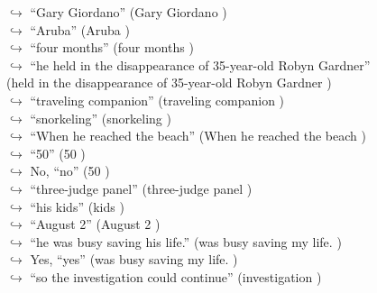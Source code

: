 \documentclass[11pt,a4paper, onecolumn]{article}
\begin{document}
\begin{figure}[t] \small \begin{tcolorbox}[boxsep=0pt,left=5pt,right=0pt,top=2pt,colback = yellow!5] \begin{dialogue}
 \small 
\colorbox{pink!25}{$\hookrightarrow$}
{ ``Gary Giordano'' (Gary Giordano ) }
\\
\colorbox{pink!25}{$\hookrightarrow$}
{ ``Aruba'' (Aruba ) }
\\
\colorbox{pink!25}{$\hookrightarrow$}
{ ``four months'' (four months ) }
\\
\colorbox{pink!25}{$\hookrightarrow$}
{ ``he held in the disappearance of 35-year-old Robyn Gardner'' (held in the disappearance of 35-year-old Robyn Gardner ) }
\\
\colorbox{pink!25}{$\hookrightarrow$}
{ ``traveling companion'' (traveling companion ) }
\\
\colorbox{pink!25}{$\hookrightarrow$}
{ ``snorkeling'' (snorkeling ) }
\\
\colorbox{pink!25}{$\hookrightarrow$}
{ ``When he reached the beach'' (When he reached the beach ) }
\\
\colorbox{pink!25}{$\hookrightarrow$}
{ ``50'' (50 ) }
\\
\colorbox{pink!25}{$\hookrightarrow$}
\colorbox{red!25}{No,}
{ ``no'' (50 ) }
\\
\colorbox{pink!25}{$\hookrightarrow$}
{ ``three-judge panel'' (three-judge panel ) }
\\
\colorbox{pink!25}{$\hookrightarrow$}
{ ``his kids'' (kids ) }
\\
\colorbox{pink!25}{$\hookrightarrow$}
{ ``August 2'' (August 2 ) }
\\
\colorbox{pink!25}{$\hookrightarrow$}
{ ``he was busy saving his life.'' (was busy saving my life. ) }
\\
\colorbox{pink!25}{$\hookrightarrow$}
\colorbox{red!25}{Yes,}
{ ``yes'' (was busy saving my life. ) }
\\
\colorbox{pink!25}{$\hookrightarrow$}
{ ``so the investigation could continue'' (investigation ) }
\\
 \end{dialogue}\end{tcolorbox}\end{figure}
\end{document}
